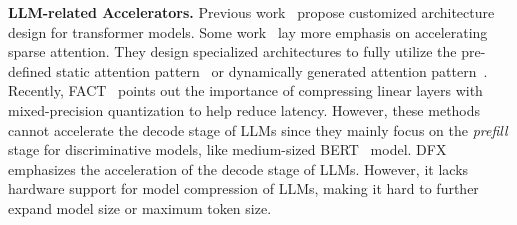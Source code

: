\textbf{LLM-related Accelerators.}
Previous work~\cite{li2020ftrans,ham2020a3,isca2021elsa,micro2021sanger,wang2021spatten,micro2022DFX,micro2022bufferfly,hpca23flat,isca2023fact,wang2023cosa} propose customized architecture design for transformer models. 
Some work~\cite{CTA2023, micro2021sanger,wang2021spatten,micro2022bufferfly,li2020ftrans,isca2021elsa} lay more emphasis on accelerating sparse attention.
They design specialized architectures to fully utilize the pre-defined static attention pattern~\cite{micro2022bufferfly,li2020ftrans} or dynamically generated attention pattern~\cite{isca2023fact,CTA2023,wang2021spatten,micro2021sanger}.
Recently, FACT~\cite{isca2023fact} points out the importance of compressing linear layers with mixed-precision quantization to help reduce latency.
However, these methods cannot accelerate the decode stage of LLMs since they mainly focus on the \textit{prefill} stage for discriminative models, like medium-sized BERT~\cite{devlin2019bert} model.
DFX~\cite{micro2022DFX} emphasizes the acceleration of the decode stage of LLMs. However, it lacks hardware support for model compression of LLMs, making it hard to further expand model size or maximum token size.
